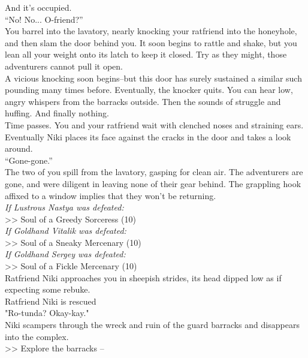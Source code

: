And it’s occupied.\\

“No! No... O-friend?”\\

You barrel into the lavatory, nearly knocking your ratfriend into the honeyhole, and then slam the door behind you. It soon begins to rattle and shake, but you lean all your weight onto its latch to keep it closed. Try as they might, those adventurers cannot pull it open.\\

A vicious knocking soon begins--but this door has surely sustained a similar such pounding many times before. Eventually, the knocker quits. You can hear low, angry whispers from the barracks outside. Then the sounds of struggle and huffing. And finally nothing.\\

Time passes. You and your ratfriend wait with clenched noses and straining ears. Eventually Niki places its face against the cracks in the door and takes a look around.\\

“Gone-gone.”\\

The two of you spill from the lavatory, gasping for clean air. The adventurers are gone, and were diligent in leaving none of their gear behind. The grappling hook affixed to a window implies that they won't be returning.\\

\emph{If Lustrous Nastya was defeated:}\\
>> Soul of a Greedy Sorceress (10)\\

\emph{If Goldhand Vitalik was defeated:}\\
>> Soul of a Sneaky Mercenary (10)\\

\emph{If Goldhand Sergey was defeated:}\\
>> Soul of a Fickle Mercenary (10)\\

Ratfriend Niki approaches you in sheepish strides, its head dipped low as if expecting some rebuke.\\
 Ratfriend Niki is rescued\\

"Ro-tunda? Okay-kay."\\

Niki scampers through the wreck and ruin of the guard barracks and disappears into the complex.\\

>> Explore the barracks -- 